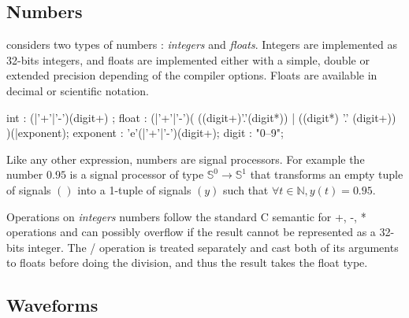 \subsection{Numbers}

\faust considers two types of numbers : \textit{integers} and \textit{floats}. Integers are implemented as 32-bits integers, and floats are implemented either with a simple, double or extended precision depending of the compiler options. Floats are available in decimal or scientific notation. 

  \begin{rail}
  int : (|'+'|'-')(digit+) ;
  float : (|'+'|'-')( ((digit+)'.'(digit*)) | ((digit*) '.' (digit+)) )(|exponent);
  exponent : 'e'(|'+'|'-')(digit+);
  digit : "0--9";
  \end{rail}

\bigskip

Like any other \faust expression, numbers are signal processors. For example the number $0.95$ is a signal processor of type $\mathbb{S}^{0}\rightarrow\mathbb{S}^{1}$ that transforms an empty tuple of signals $()$ into a 1-tuple of signals $(y)$ such that $\forall t\in\mathbb{N}, y(t)=0.95$.

Operations on \textit{integers} numbers follow the standard C semantic for +, -, * operations and can possibly overflow if the result cannot be represented as a  32-bits integer. The / operation is treated separately and cast both of its arguments to floats before doing the division, and thus the result takes the float type.



\subsection{Waveforms}


